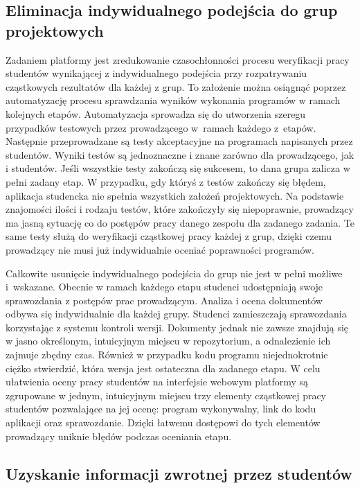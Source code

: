 \subsection{Eliminacja indywidualnego podejścia do grup projektowych}

Zadaniem platformy jest zredukowanie czasochłonności procesu weryfikacji pracy studentów wynikającej z indywidualnego podejścia przy rozpatrywaniu cząstkowych rezultatów dla każdej z grup.
To założenie można osiągnąć poprzez automatyzację procesu sprawdzania wyników wykonania programów w ramach kolejnych etapów.
Automatyzacja sprowadza się do utworzenia szeregu przypadków testowych przez prowadzącego w~ramach każdego z~etapów.
Następnie przeprowadzane są testy akceptacyjne na programach napisanych przez studentów.
Wyniki testów są jednoznaczne i znane zarówno dla prowadzącego, jak i studentów.
Jeśli wszystkie testy zakończą się sukcesem, to dana grupa zalicza w pełni zadany etap.
W przypadku, gdy któryś z testów zakończy się błędem, aplikacja studencka nie spełnia wszystkich założeń projektowych.
Na podstawie znajomości ilości i rodzaju testów, które zakończyły się niepoprawnie, prowadzący ma jasną sytuację co do postępów pracy danego zespołu dla zadanego zadania.
Te same testy służą do weryfikacji cząstkowej pracy każdej z grup, dzięki czemu prowadzący nie musi już indywidualnie oceniać poprawności programów.

Całkowite usunięcie indywidualnego podejścia do grup nie jest w pełni możliwe i~wskazane.
Obecnie w ramach każdego etapu studenci udostępniają swoje sprawozdania z postępów prac prowadzącym.
Analiza i ocena dokumentów odbywa się indywidualnie dla każdej grupy.
Studenci zamieszczają sprawozdania korzystając z systemu kontroli wersji.
Dokumenty jednak nie zawsze znajdują się w jasno określonym, intuicyjnym miejscu w repozytorium, a odnalezienie ich zajmuje zbędny czas.
Również w przypadku kodu programu niejednokrotnie ciężko stwierdzić, która wersja jest ostateczna dla zadanego etapu.
W celu ułatwienia oceny pracy studentów na interfejsie webowym platformy są zgrupowane w jednym, intuicyjnym miejscu trzy elementy cząstkowej pracy studentów pozwalające na jej ocenę: program wykonywalny, link do kodu aplikacji oraz sprawozdanie.
Dzięki łatwemu dostępowi do tych elementów prowadzący uniknie błędów podczas oceniania etapu.


\subsection{Uzyskanie informacji zwrotnej przez studentów}
\label{feedback}

